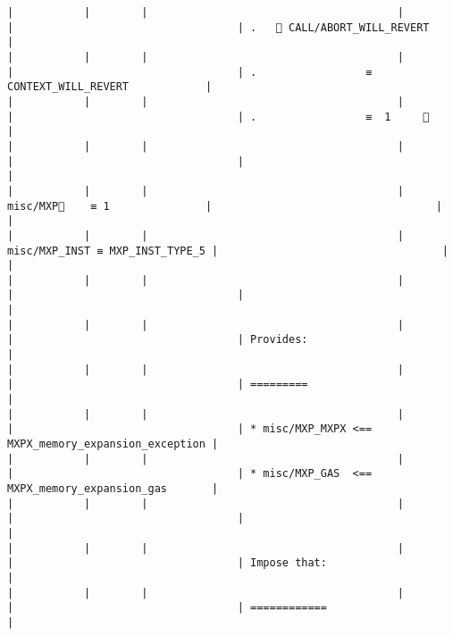 \documentclass[varwidth=\maxdimen,margin=0.5cm,multi={verbatim}]{standalone}
\begin{document}
\begin{verbatim}
|           |        |                                       |                                 |                                   | .    CALL/ABORT_WILL_REVERT                        |
|           |        |                                       |                                 |                                   | .                 ≡  CONTEXT_WILL_REVERT            |
|           |        |                                       |                                 |                                   | .                 ≡  1     👋                       |
|           |        |                                       |                                 |                                   |                                                     |
|           |        |                                       | misc/MXP🚩    ≡ 1               |                                   |                                                     |
|           |        |                                       | misc/MXP_INST ≡ MXP_INST_TYPE_5 |                                   |                                                     |
|           |        |                                       |                                 |                                   |                                                     |
|           |        |                                       |                                 |                                   | Provides:                                           |
|           |        |                                       |                                 |                                   | =========                                           |
|           |        |                                       |                                 |                                   | * misc/MXP_MXPX <== MXPX_memory_expansion_exception |
|           |        |                                       |                                 |                                   | * misc/MXP_GAS  <== MXPX_memory_expansion_gas       |
|           |        |                                       |                                 |                                   |                                                     |
|           |        |                                       |                                 |                                   | Impose that:                                        |
|           |        |                                       |                                 |                                   | ============                                        |

\end{verbatim}
\end{document}
